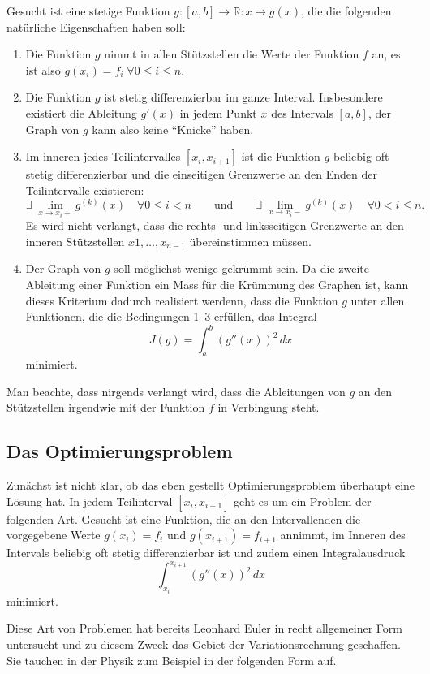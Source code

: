 Gesucht ist eine stetige Funktion $g\colon[a,b]\to\mathbb R:x\mapsto g(x)$,
die die folgenden natürliche Eigenschaften haben soll:
\begin{enumerate}
\item
Die Funktion $g$ nimmt in allen Stützstellen die Werte der Funktion
$f$ an, es ist also $g(x_i)=f_i\;\forall 0\le i\le n$.
\item
Die Funktion $g$ ist stetig differenzierbar im ganze Interval.
Insbesondere existiert die Ableitung $g'(x)$ in jedem Punkt $x$ des
Intervals $[a,b]$, der Graph von $g$ kann also keine ``Knicke'' haben.
\item
Im inneren jedes Teilintervalles $[x_i,x_{i+1}]$ ist die Funktion $g$
beliebig oft stetig differenzierbar und die einseitigen Grenzwerte 
an den Enden der Teilintervalle existieren:
\[
\exists\; \lim_{x\to x_i+} g^{(k)}(x) \quad\forall 0\le i < n
\qquad\text{und}\qquad
\exists\; \lim_{x\to x_i-} g^{(k)}(x) \quad\forall 0< i \le n.
\]
Es wird nicht verlangt, dass die rechts- und linksseitigen Grenzwerte
an den inneren Stützstellen $x1,\dots,x_{n-1}$ übereinstimmen müssen.
\item
Der Graph von $g$ soll möglichst wenige gekrümmt sein.
Da die zweite Ableitung einer Funktion ein Mass für die Krümmung des 
Graphen ist, kann dieses Kriterium dadurch realisiert werdenn, dass
die Funktion $g$ unter allen Funktionen, die die Bedingungen 1--3 erfüllen,
das Integral
\[
J(g)
=
\int_a^b (g''(x) )^2\,dx
\]
minimiert.
\end{enumerate}

Man beachte, dass nirgends verlangt wird, dass die Ableitungen von $g$
an den Stützstellen irgendwie mit der Funktion $f$ in Verbingung steht.

\subsection{Das Optimierungsproblem
\label{buch:subsection:variation}}
Zunächst ist nicht klar, ob das eben gestellt Optimierungsproblem überhaupt
eine Lösung hat. 
In jedem Teilinterval $[x_i,x_{i+1}]$ geht es um ein Problem der
folgenden Art.
Gesucht ist eine Funktion, die an den Intervallenden die vorgegebene
Werte $g(x_i)=f_i$ und $g(x_{i+1})=f_{i+1}$ annimmt, im Inneren des
Intervals beliebig oft stetig differenzierbar ist und zudem einen
Integralausdruck
\[
\int_{x_i}^{x_{i+1}} (g''(x))^2\,dx
\]
minimiert.

Diese Art von Problemen hat bereits Leonhard Euler in recht allgemeiner
Form untersucht und zu diesem Zweck das Gebiet der Variationsrechnung
geschaffen.
Sie tauchen in der Physik zum Beispiel in der folgenden Form auf.

